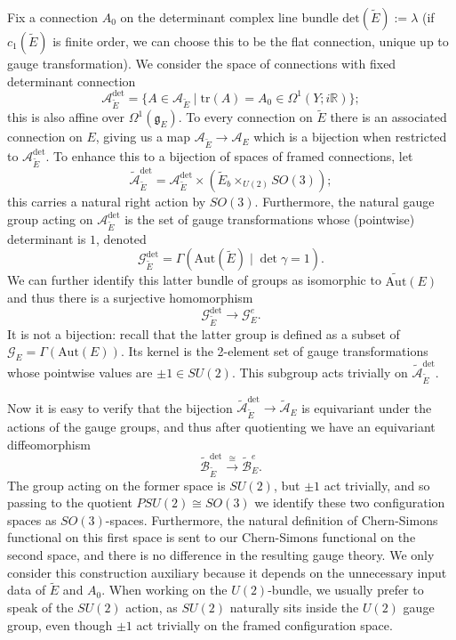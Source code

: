 \documentclass[10pt,a4paper]{amsart}
\theoremstyle{definition}
\theoremstyle{remark}
\numberwithin{figure}{qchap}
\begin{document}
Fix a connection $A_0$ on the determinant complex line bundle $\text{det}(\tilde E) := \lambda$ (if $c_1(\tilde E)$ is finite order, we can choose this to be the flat connection, unique up to gauge transformation). We consider the space of connections with fixed determinant connection $$\mathcal A_{\tilde E}^{\det} = \{A \in \mathcal A_{\tilde E} \mid \text{tr}(A) = A_0 \in \Omega^1(Y;i\mathbb R)\};$$ this is also affine over $\Omega^1(\mathfrak g_E)$. To every connection on $\tilde E$ there is an associated connection on $E$, giving us a map $\mathcal A_{\tilde E} \to \mathcal A_E$ which is a bijection when restricted to $\mathcal A_{\tilde E}^\text{det}$. To enhance this to a bijection of spaces of framed connections, let 
$$\widetilde{\mathcal A}_{\tilde E}^\text{det} = \mathcal A_{\tilde E}^{\text{det}} \times (\tilde E_b \times_{U(2)} SO(3));$$ 
this carries a natural right action by $SO(3)$. Furthermore, the natural gauge group acting on $\mathcal A_{\tilde E}^\text{det}$ is the set of gauge transformations whose (pointwise) determinant is $1$, denoted 
$$\mathcal G_{\tilde E}^{\text{det}} = \Gamma(\text{Aut}(\tilde E) \mid \det \gamma = 1).$$ 
We can further identify this latter bundle of groups as isomorphic to $\widetilde{\text{Aut}}(E)$ and thus there is a surjective homomorphism $$\mathcal G_{\tilde E}^{\text{det}} \to \mathcal G^e_E.$$ It is not a bijection: recall that the latter group is defined as a subset of $\mathcal G_E = \Gamma(\text{Aut}(E))$. Its kernel is the 2-element set of gauge transformations whose pointwise values are $\pm 1 \in SU(2)$. This subgroup acts trivially on $\widetilde{\mathcal A}_{\tilde E}^\text{det}$.

Now it is easy to verify that the bijection $\widetilde{\mathcal A}_{\tilde E}^\text{det} \to \widetilde{\mathcal A}_E$ is equivariant under the actions of the gauge groups, and thus after quotienting we have an equivariant diffeomorphism \begin{equation}\label{U(2)}\widetilde{\mathcal B}_{\tilde E}^\text{det} \xrightarrow{\cong} \widetilde{\mathcal B}^e_E.\end{equation} The group acting on the former space is $SU(2)$, but $\pm 1$ act trivially, and so passing to the quotient $PSU(2) \cong SO(3)$ we identify these two configuration spaces as $SO(3)$-spaces. Furthermore, the natural definition of Chern-Simons functional on this first space is sent to our Chern-Simons functional on the second space, and there is no difference in the resulting gauge theory. We only consider this construction auxiliary because it depends on the unnecessary input data of $\tilde E$ and $A_0$. When working on the $U(2)$-bundle, we usually prefer to speak of the $SU(2)$ action, as $SU(2)$ naturally sits inside the $U(2)$ gauge group, even though $\pm 1$ act trivially on the framed configuration space.
\end{document}
